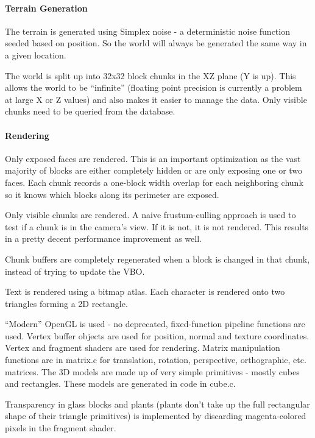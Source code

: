 \paragraph*{Terrain Generation}

The terrain is generated using Simplex noise -\/ a deterministic noise function seeded based on position. So the world will always be generated the same way in a given location.

The world is split up into 32x32 block chunks in the XZ plane (Y is up). This allows the world to be “infinite” (floating point precision is currently a problem at large X or Z values) and also makes it easier to manage the data. Only visible chunks need to be queried from the database.

\paragraph*{Rendering}

Only exposed faces are rendered. This is an important optimization as the vast majority of blocks are either completely hidden or are only exposing one or two faces. Each chunk records a one-\/block width overlap for each neighboring chunk so it knows which blocks along its perimeter are exposed.

Only visible chunks are rendered. A naive frustum-\/culling approach is used to test if a chunk is in the camera’s view. If it is not, it is not rendered. This results in a pretty decent performance improvement as well.

Chunk buffers are completely regenerated when a block is changed in that chunk, instead of trying to update the V\+BO.

Text is rendered using a bitmap atlas. Each character is rendered onto two triangles forming a 2D rectangle.

“\+Modern” Open\+GL is used -\/ no deprecated, fixed-\/function pipeline functions are used. Vertex buffer objects are used for position, normal and texture coordinates. Vertex and fragment shaders are used for rendering. Matrix manipulation functions are in matrix.\+c for translation, rotation, perspective, orthographic, etc. matrices. The 3D models are made up of very simple primitives -\/ mostly cubes and rectangles. These models are generated in code in cube.\+c.

Transparency in glass blocks and plants (plants don’t take up the full rectangular shape of their triangle primitives) is implemented by discarding magenta-\/colored pixels in the fragment shader.

